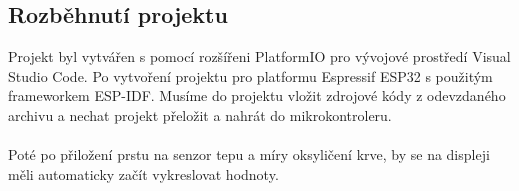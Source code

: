 \subsection{Rozběhnutí projektu}
Projekt byl vytvářen s pomocí rozšířeni PlatformIO pro vývojové prostředí Visual Studio Code.
Po vytvoření projektu pro platformu Espressif ESP32 s použitým frameworkem ESP-IDF. Musíme do projektu vložit zdrojové kódy z odevzdaného archivu a nechat projekt přeložit a nahrát do mikrokontroleru. \\ \\
Poté po přiložení prstu na senzor tepu a míry oksyličení krve, by se na displeji měli automaticky začít vykreslovat hodnoty.

\newpage